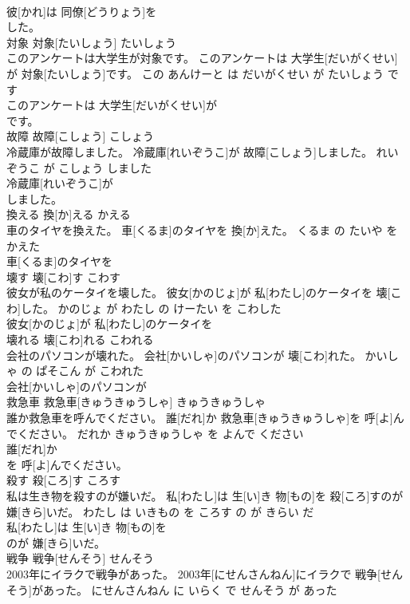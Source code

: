 \documentclass[8pt]{extreport}
\begin{document}
\begin{CJK}{UTF8}{min}
\\	彼[かれ]は 同僚[どうりょう]を
\\	した。			
\\	対象	対象[たいしょう]	たいしょう	
\\	このアンケートは大学生が対象です。	このアンケートは 大学生[だいがくせい]が 対象[たいしょう]です。	この あんけーと は だいがくせい が たいしょう です	
\\	このアンケートは 大学生[だいがくせい]が
\\	です。			
\\	故障	故障[こしょう]	こしょう	
\\	冷蔵庫が故障しました。	冷蔵庫[れいぞうこ]が 故障[こしょう]しました。	れいぞうこ が こしょう しました	
\\	冷蔵庫[れいぞうこ]が
\\	しました。			
\\	換える	換[か]える	かえる	
\\	車のタイヤを換えた。	車[くるま]のタイヤを 換[か]えた。	くるま の たいや を かえた	
\\	車[くるま]のタイヤを
\\	壊す	壊[こわ]す	こわす	
\\	彼女が私のケータイを壊した。	彼女[かのじょ]が 私[わたし]のケータイを 壊[こわ]した。	かのじょ が わたし の けーたい を こわした	
\\	彼女[かのじょ]が 私[わたし]のケータイを
\\	壊れる	壊[こわ]れる	こわれる	
\\	会社のパソコンが壊れた。	会社[かいしゃ]のパソコンが 壊[こわ]れた。	かいしゃ の ぱそこん が こわれた	
\\	会社[かいしゃ]のパソコンが
\\	救急車	救急車[きゅうきゅうしゃ]	きゅうきゅうしゃ	
\\	誰か救急車を呼んでください。	誰[だれ]か 救急車[きゅうきゅうしゃ]を 呼[よ]んでください。	だれか きゅうきゅうしゃ を よんで ください	
\\	誰[だれ]か
\\	を 呼[よ]んでください。			
\\	殺す	殺[ころ]す	ころす	
\\	私は生き物を殺すのが嫌いだ。	私[わたし]は 生[い]き 物[もの]を 殺[ころ]すのが 嫌[きら]いだ。	わたし は いきもの を ころす の が きらい だ	
\\	私[わたし]は 生[い]き 物[もの]を
\\	のが 嫌[きら]いだ。			
\\	戦争	戦争[せんそう]	せんそう	
\\	2003年にイラクで戦争があった。	2003年[にせんさんねん]にイラクで 戦争[せんそう]があった。	にせんさんねん に いらく で せんそう が あった	

\end{CJK}
\end{document}
